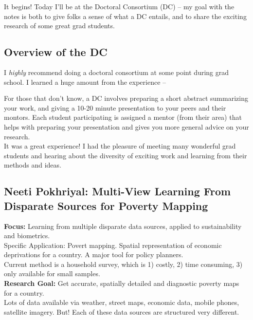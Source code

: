 It begins! Today I'll be at the Doctoral Consortium (DC) -- my goal with the notes is both to give folks a sense of what a DC entails, and to share the exciting research of some great grad students.

\subsection{Overview of the DC}

I {\it highly} recommend doing a doctoral consortium at some point during grad school. I learned a huge amount from the experience --

For those that don't know, a DC involves preparing a short abstract summarizing your work, and giving a 10-20 minute presentation to your peers and their montors. Each student participating is assigned a mentor (from their area) that helps with preparing your presentation and gives you more general advice on your research. \\

It was a great experience! I had the pleasure of meeting many wonderful grad students and hearing about the diversity of exciting work and learning from their methods and ideas.



\subsection{Neeti Pokhriyal: Multi-View Learning From Disparate Sources for Poverty Mapping}

{\bf Focus:} Learning from multiple disparate data sources, applied to sustainability and biometrics. \\

Specific Application: Povert mapping. Spatial representation of economic deprivations for a country. A major tool for policy planners. \\

Current method is a household survey, which is 1) costly, 2) time consuming, 3) only available for small samples. \\

{\bf Research Goal:} Get accurate, spatially detailed and diagnostic poverty maps for a country. \\

Lots of data available via weather, street maps, economic data, mobile phones, satellite imagery. But! Each of these data sources are structured very different. \\

